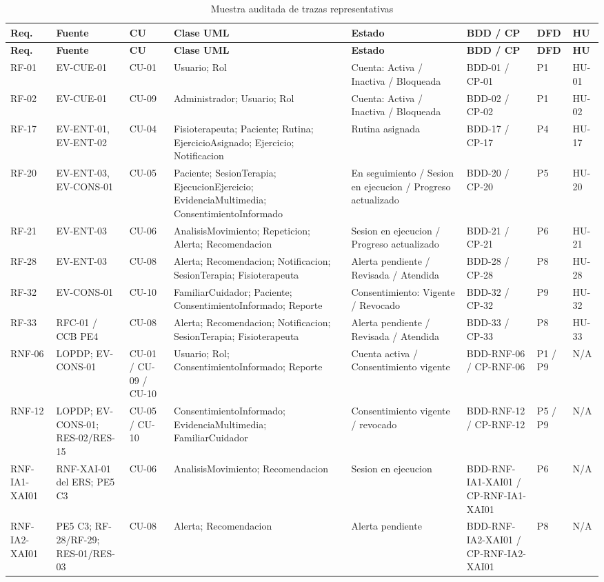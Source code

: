 \documentclass[12pt,a4paper]{article}
\begin{document}
\setlength{\tabcolsep}{2.5pt}
\scriptsize
\begin{longtable}{p{}p{}p{}p{}p{}p{}p{}p{}}
\caption{Muestra auditada de trazas representativas}\\
\toprule
\textbf{Req.}&\textbf{Fuente}&\textbf{CU}&\textbf{Clase UML}&\textbf{Estado}&\textbf{BDD / CP}&\textbf{DFD}&\textbf{HU}\\
\midrule\endfirsthead
\toprule
\textbf{Req.}&\textbf{Fuente}&\textbf{CU}&\textbf{Clase UML}&\textbf{Estado}&\textbf{BDD / CP}&\textbf{DFD}&\textbf{HU}\\
\midrule\endhead
RF-01 & EV-CUE-01 & CU-01 & Usuario; Rol & Cuenta: Activa / Inactiva / Bloqueada & BDD-01 / CP-01 & P1 & HU-01 \\
RF-02 & EV-CUE-01 & CU-09 & Administrador; Usuario; Rol & Cuenta: Activa / Inactiva / Bloqueada & BDD-02 / CP-02 & P1 & HU-02 \\
RF-17 & EV-ENT-01, EV-ENT-02 & CU-04 & Fisioterapeuta; Paciente; Rutina; EjercicioAsignado; Ejercicio; Notificacion & Rutina asignada & BDD-17 / CP-17 & P4 & HU-17 \\
RF-20 & EV-ENT-03, EV-CONS-01 & CU-05 & Paciente; SesionTerapia; EjecucionEjercicio; EvidenciaMultimedia; ConsentimientoInformado & En seguimiento / Sesion en ejecucion / Progreso actualizado & BDD-20 / CP-20 & P5 & HU-20 \\
RF-21 & EV-ENT-03 & CU-06 & AnalisisMovimiento; Repeticion; Alerta; Recomendacion & Sesion en ejecucion / Progreso actualizado & BDD-21 / CP-21 & P6 & HU-21 \\
RF-28 & EV-ENT-03 & CU-08 & Alerta; Recomendacion; Notificacion; SesionTerapia; Fisioterapeuta & Alerta pendiente / Revisada / Atendida & BDD-28 / CP-28 & P8 & HU-28 \\
RF-32 & EV-CONS-01 & CU-10 & FamiliarCuidador; Paciente; ConsentimientoInformado; Reporte & Consentimiento: Vigente / Revocado & BDD-32 / CP-32 & P9 & HU-32 \\
RF-33 & RFC-01 / CCB PE4 & CU-08 & Alerta; Recomendacion; Notificacion; SesionTerapia; Fisioterapeuta & Alerta pendiente / Revisada / Atendida & BDD-33 / CP-33 & P8 & HU-33 \\
RNF-06 & LOPDP; EV-CONS-01 & CU-01 / CU-09 / CU-10 & Usuario; Rol; ConsentimientoInformado; Reporte & Cuenta activa / Consentimiento vigente & BDD-RNF-06 / CP-RNF-06 & P1 / P9 & N/A \\
RNF-12 & LOPDP; EV-CONS-01; RES-02/RES-15 & CU-05 / CU-10 & ConsentimientoInformado; EvidenciaMultimedia; FamiliarCuidador & Consentimiento vigente / revocado & BDD-RNF-12 / CP-RNF-12 & P5 / P9 & N/A \\
RNF-IA1-XAI01 & RNF-XAI-01 del ERS; PE5 C3 & CU-06 & AnalisisMovimiento; Recomendacion & Sesion en ejecucion & BDD-RNF-IA1-XAI01 / CP-RNF-IA1-XAI01 & P6 & N/A \\
RNF-IA2-XAI01 & PE5 C3; RF-28/RF-29; RES-01/RES-03 & CU-08 & Alerta; Recomendacion & Alerta pendiente & BDD-RNF-IA2-XAI01 / CP-RNF-IA2-XAI01 & P8 & N/A \\
\bottomrule\end{longtable}\normalsize\setlength{\tabcolsep}{6pt}
\end{document}
